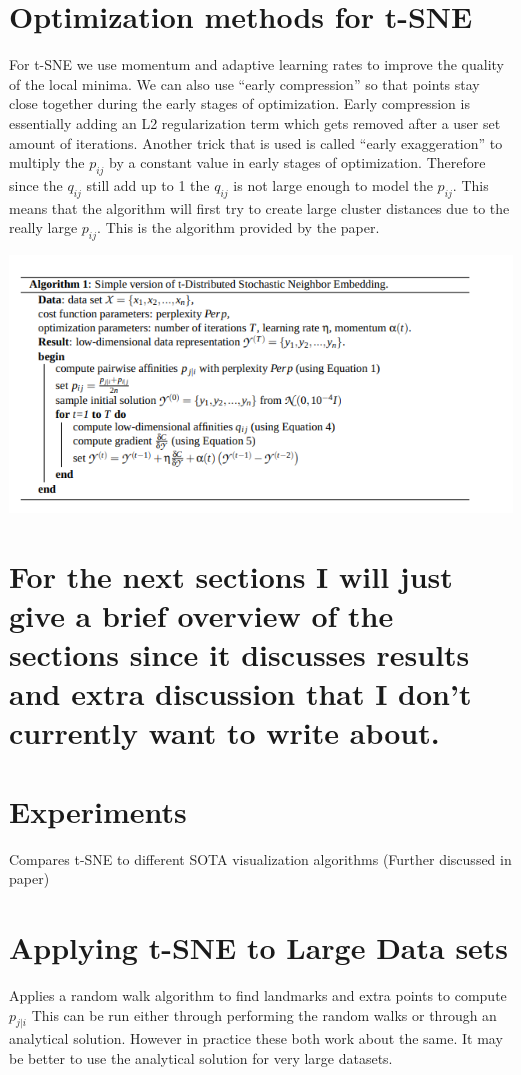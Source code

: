 \documentclass[11pt]{article}
\begin{document}
\section{Optimization methods for t-SNE}
\label{sec:org9a125e0}
For t-SNE we use momentum and adaptive learning rates to improve the quality of the local minima.
We can also use ``early compression'' so that points stay close together during the early stages of optimization.
Early compression is essentially adding an L2 regularization term which gets removed after a user set amount of iterations.
Another trick that is used is called ``early exaggeration'' to multiply the \(p_{ij}\) by a constant value in early stages of optimization.
Therefore since the \(q_{ij}\) still add up to 1 the \(q_{ij}\) is not large enough to model the \(p_{ij}\). This means that the algorithm will first try to create large cluster distances due to the really large \(p_{ij}\).
This is the algorithm provided by the paper.
\begin{center}
\includegraphics[width=.9\linewidth]{./images/tsne_algo.png}
\end{center}

\section{For the next sections I will just give a brief overview of the sections since it discusses results and extra discussion that I don't currently want to write about.}
\label{sec:orgabe5242}

\section{Experiments}
\label{sec:org11ab568}
Compares t-SNE to different SOTA visualization algorithms (Further discussed in paper)
\section{Applying t-SNE to Large Data sets}
\label{sec:orge80b906}
Applies a random walk algorithm to find landmarks and extra points to compute \(p_{j|i}\)
This can be run either through performing the random walks or through an analytical solution. However in practice these both work about the same.
It may be better to use the analytical solution for very large datasets.
\end{document}
